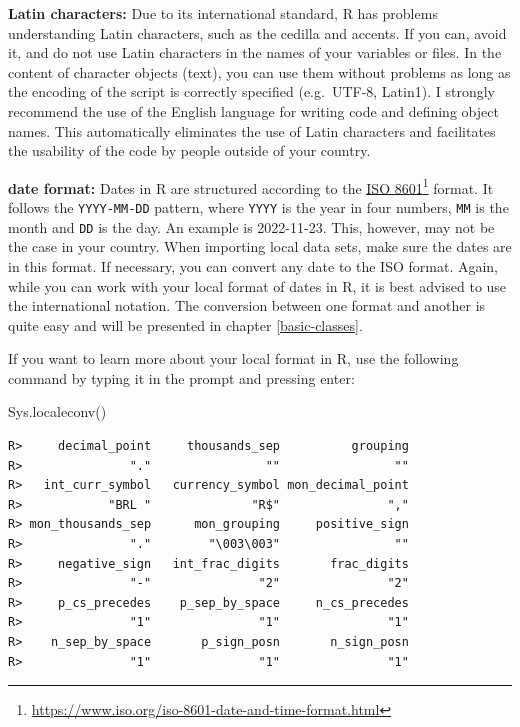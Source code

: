 \documentclass[
  12pt,
]{book}
\newenvironment{Shaded}{\begin{snugshade}}{\end{snugshade}}
\newcommand{\FunctionTok}[1]{\textcolor[rgb]{0,0,0}{#1}}
\newcommand{\NormalTok}[1]{#1}
\begin{document}
\textbf{Latin characters:} Due to its international standard, R has problems understanding Latin characters, such as the cedilla and accents. If you can, avoid it, and do not use Latin characters in the names of your variables or files. In the content of character objects (text), you can use them without problems as long as the encoding of the script is correctly specified (e.g.~UTF-8, Latin1). I strongly recommend the use of the English language for writing code and defining object names. This automatically eliminates the use of Latin characters and facilitates the usability of the code by people outside of your country.   

\textbf{date format:} Dates in R are structured according to the \href{https://www.iso.org/iso-8601-date-and-time-format.html}{ISO 8601}\footnote{\url{https://www.iso.org/iso-8601-date-and-time-format.html}} format. It follows the \texttt{YYYY-MM-DD} pattern, where \texttt{YYYY} is the year in four numbers, \texttt{MM} is the month and \texttt{DD} is the day. An example is 2022-11-23. This, however, may not be the case in your country. When importing local data sets, make sure the dates are in this format. If necessary, you can convert any date to the ISO format. Again, while you can work with your local format of dates in R, it is best advised to use the international notation. The conversion between one format and another is quite easy and will be presented in chapter \ref{basic-classes}. 

If you want to learn more about your local format in R, use the following command by typing it in the prompt and pressing enter:

\begin{Shaded}
\begin{Highlighting}[]
\FunctionTok{Sys.localeconv}\NormalTok{()}
\end{Highlighting}
\end{Shaded}

\begin{verbatim}
R>     decimal_point     thousands_sep          grouping 
R>               "."                ""                "" 
R>   int_curr_symbol   currency_symbol mon_decimal_point 
R>            "BRL "              "R$"               "," 
R> mon_thousands_sep      mon_grouping     positive_sign 
R>               "."        "\003\003"                "" 
R>     negative_sign   int_frac_digits       frac_digits 
R>               "-"               "2"               "2" 
R>     p_cs_precedes    p_sep_by_space     n_cs_precedes 
R>               "1"               "1"               "1" 
R>    n_sep_by_space       p_sign_posn       n_sign_posn 
R>               "1"               "1"               "1"
\end{verbatim}
\end{document}
